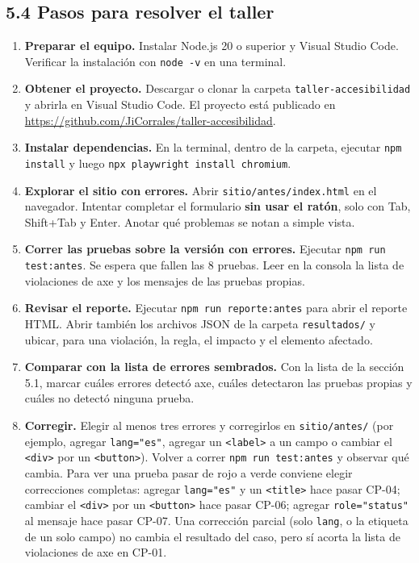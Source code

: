 \documentclass[10pt,letterpaper,onecolumn]{IEEEtran}
\begin{document}
\subsection{5.4 Pasos para resolver el taller}\label{pasos-para-resolver-el-taller}

\begin{enumerate}
\def\labelenumi{\arabic{enumi}.}
\item
  \textbf{Preparar el equipo.} Instalar Node.js 20 o superior y Visual Studio Code. Verificar la instalación con \texttt{node -\allowbreak{}\allowbreak{}v} en una terminal.
\item
  \textbf{Obtener el proyecto.} Descargar o clonar la carpeta \texttt{taller-\allowbreak{}\allowbreak{}accesibilidad} y abrirla en Visual Studio Code. El proyecto está publicado en \url{https://github.com/JiCorrales/taller-accesibilidad}.
\item
  \textbf{Instalar dependencias.} En la terminal, dentro de la carpeta, ejecutar \texttt{npm install} y luego \texttt{npx playwright install chromium}.
\item
  \textbf{Explorar el sitio con errores.} Abrir \texttt{sitio/\allowbreak{}\allowbreak{}antes/\allowbreak{}\allowbreak{}index.\allowbreak{}\allowbreak{}html} en el navegador. Intentar completar el formulario \textbf{sin usar el ratón}, solo con Tab, Shift+Tab y Enter. Anotar qué problemas se notan a simple vista.
\item
  \textbf{Correr las pruebas sobre la versión con errores.} Ejecutar \texttt{npm run test:\allowbreak{}antes}. Se espera que fallen las 8 pruebas. Leer en la consola la lista de violaciones de axe y los mensajes de las pruebas propias.
\item
  \textbf{Revisar el reporte.} Ejecutar \texttt{npm run reporte:\allowbreak{}antes} para abrir el reporte HTML. Abrir también los archivos JSON de la carpeta \texttt{resultados/\allowbreak{}\allowbreak{}} y ubicar, para una violación, la regla, el impacto y el elemento afectado.
\item
  \textbf{Comparar con la lista de errores sembrados.} Con la lista de la sección 5.1, marcar cuáles errores detectó axe, cuáles detectaron las pruebas propias y cuáles no detectó ninguna prueba.
\item
  \textbf{Corregir.} Elegir al menos tres errores y corregirlos en \texttt{sitio/\allowbreak{}\allowbreak{}antes/\allowbreak{}\allowbreak{}} (por ejemplo, agregar \texttt{lang="es"}, agregar un \texttt{<label>} a un campo o cambiar el \texttt{<div>} por un \texttt{<button>}). Volver a correr \texttt{npm run test:\allowbreak{}antes} y observar qué cambia. Para ver una prueba pasar de rojo a verde conviene elegir correcciones completas: agregar \texttt{lang="es"} y un \texttt{<title>} hace pasar CP-04; cambiar el \texttt{<div>} por un \texttt{<button>} hace pasar CP-06; agregar \texttt{role="status"} al mensaje hace pasar CP-07. Una corrección parcial (solo \texttt{lang}, o la etiqueta de un solo campo) no cambia el resultado del caso, pero sí acorta la lista de violaciones de axe en CP-01.

\end{enumerate}
\end{document}
